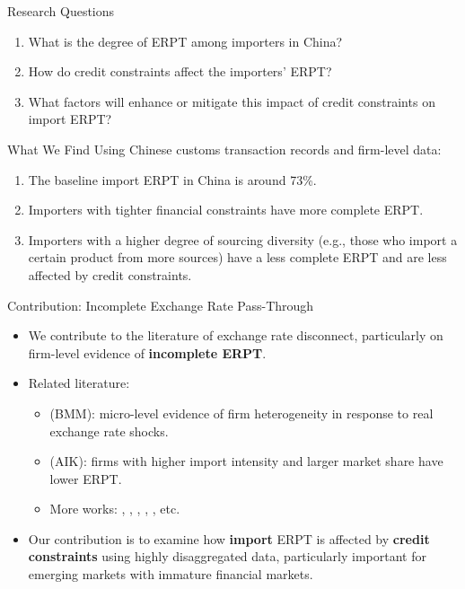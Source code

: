 \documentclass[10pt]{beamer}
\begin{document}
\begin{frame}{Research Questions}
    \begin{enumerate}
        \item What is the degree of ERPT among importers in China? 
        \bigskip
	\item How do credit constraints affect the importers' ERPT? 
        \bigskip
	\item What factors will enhance or mitigate this impact of credit constraints on import ERPT?
    \end{enumerate}
\end{frame}

\begin{frame}{What We Find}
Using Chinese customs transaction records and firm-level data:	
\medskip
    \begin{enumerate}
	\item The baseline import ERPT in China is around 73\%.
        \medskip
	\item Importers with tighter financial constraints have more complete ERPT.
        \medskip
	\item Importers with a higher degree of sourcing diversity (e.g., those who import a certain product from more sources) have a less complete ERPT and are less affected by credit constraints.
    \end{enumerate}	
\end{frame}

\begin{frame}{Contribution: Incomplete Exchange Rate Pass-Through}
    \begin{itemize}
	\item We contribute to the literature of exchange rate disconnect, particularly on firm-level evidence of \textbf{incomplete ERPT}.
        \medskip
	\item Related literature:
	\begin{itemize}
		\item \cite{bmm2012} (BMM): micro-level evidence of firm heterogeneity in response to real exchange rate shocks.
		\item \cite{aik2014} (AIK): firms with higher import intensity and larger market share have lower ERPT.
		\item More works: \cite{lmx2015}, \cite{chen2016}, \cite{garetto2016}, \cite{auer2016}, \cite{devereux2017}, etc.
	\end{itemize}
        \medskip
	\item Our contribution is to examine how \textbf{import} ERPT is affected by \textbf{credit constraints} using highly disaggregated data, particularly important for emerging markets with immature financial markets.
	\end{itemize}
\end{frame}
\end{document}
